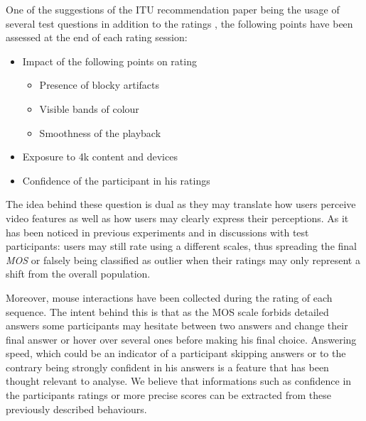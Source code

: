 One of the suggestions of the ITU recommendation paper being the usage of several test questions in addition to the ratings \cite{rec1998p}, the following points have been assessed at the end of each rating session:
\begin{itemize}
	\item Impact of the following points on rating 
	\begin{itemize}
		\item Presence of blocky artifacts
		\item Visible bands of colour
		\item Smoothness of the playback
	\end{itemize}
	\item Exposure to 4k content and devices
	\item Confidence of the participant in his ratings
\end{itemize}

The idea behind these question is dual as they may translate how users perceive video features as well as how users may clearly express their perceptions. As it has been noticed in previous experiments and in discussions with test participants: users may still rate using a different scales, thus spreading the final \textit{MOS} or falsely being classified as outlier when their ratings may only represent a shift from the overall population. 

Moreover, mouse interactions have been collected during the rating of each sequence. The intent behind this is that as the MOS scale forbids detailed answers some participants may hesitate between two answers and change their final answer or hover over several ones before making his final choice.
Answering speed, which could be an indicator of a participant skipping answers or to the contrary being strongly confident in his answers is a feature that has been thought relevant to analyse. 
We believe that informations such as confidence in the participants ratings or more precise scores can be extracted from these previously described behaviours.
